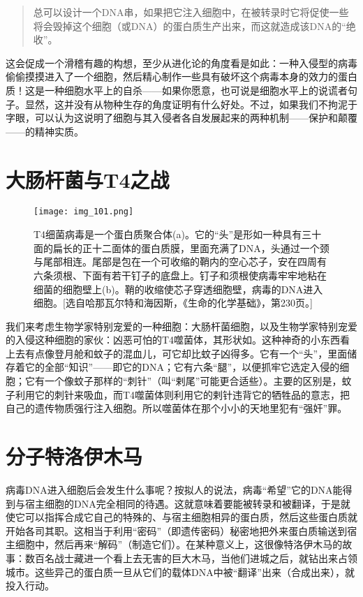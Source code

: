 \begin{quote}
总可以设计一个DNA串，如果把它注入细胞中，在被转录时它将促使一些将会毁掉这个细胞（或DNA）的蛋白质生产出来，而这就造成该DNA的“绝收”。
\end{quote}

这会促成一个滑稽有趣的构想，至少从进化论的角度看是如此：一种入侵型的病毒偷偷摸摸进入了一个细胞，然后精心制作一些具有破坏这个病毒本身的效力的蛋白质！这是一种细胞水平上的自杀——如果你愿意，也可说是细胞水平上的说谎者句子。显然，这并没有从物种生存的角度证明有什么好处。不过，如果我们不拘泥于字眼，可以认为这说明了细胞与其入侵者各自发展起来的两种机制——保护和颠覆——的精神实质。

\section{大肠杆菌与T4之战}

\begin{figure}
\texttt{[image: img\_101.png]}
\caption[T4细菌病毒。]
  {T4细菌病毒是一个蛋白质聚合体(a)。它的“头”是形如一种具有三十面的扁长的正十二面体的蛋白质膜，里面充满了DNA，头通过一个颈与尾部相连。尾部是包在一个可收缩的鞘内的空心芯子，安在四周有六条须根、下面有若干钉子的底盘上。钉子和须根使病毒牢牢地粘在细菌的细胞壁上(b)。鞘的收缩使芯子穿透细胞壁，病毒的DNA进入细胞。[选自哈那瓦尔特和海因斯，《生命的化学基础》，第230页。] }
\end{figure}

我们来考虑生物学家特别宠爱的一种细胞：大肠杆菌细胞，以及生物学家特别宠爱的入侵这种细胞的家伙：凶恶可怕的T4噬菌体，其形状如。这种神奇的小东西看上去有点像登月舱和蚊子的混血儿，可它却比蚊子凶得多。它有一个“头”，里面储存着它的全部“知识”——即它的DNA；它有六条“腿”，以便抓牢它选定入侵的细胞；它有一个像蚊子那样的“刺针”（叫“剌尾”可能更合适些）。主要的区别是，蚊子利用它的刺针来吸血，而T4噬菌体则利用它的剌针违背它的牺牲品的意志，把自己的遗传物质强行注入细胞。所以噬菌体在那个小小的天地里犯有“强奸”罪。

\section{分子特洛伊木马}

病毒DNA进入细胞后会发生什么事呢？按拟人的说法，病毒“希望”它的DNA能得到与宿主细胞的DNA完全相同的待遇。这就意味着要能被转录和被翻译，于是就使它可以指挥合成它自己的特殊的、与宿主细胞相异的蛋白质，然后这些蛋白质就开始各司其职。这相当于利用“密码”（即遗传密码）秘密地把外来蛋白质输送到宿主细胞中，然后再来“解码”（制造它们）。在某种意义上，这很像特洛伊木马的故事：数百名战士藏进一个看上去无害的巨大木马，当他们进城之后，就钻出来占领城市。这些异己的蛋白质一旦从它们的载体DNA中被“翻译”出来（合成出来），就投入行动。

